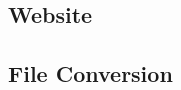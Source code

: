 
\subsection{Website}

\begin{DoxyCompactList}
    
\end{DoxyCompactList}

\subsection{File Conversion}

\begin{DoxyCompactList}
    
\end{DoxyCompactList}
